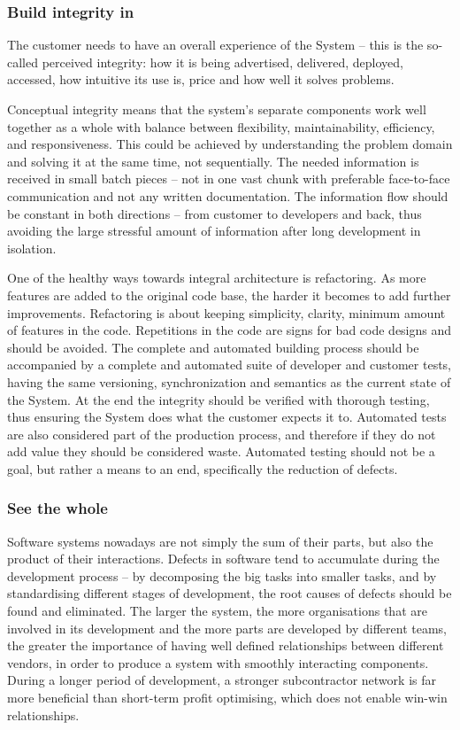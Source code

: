 \subsubsection{Build integrity in}

The customer needs to have an overall experience of the System -- this is the so-called perceived integrity: how it is being advertised, delivered, deployed, accessed, how intuitive its use is, price and how well it solves problems.

Conceptual integrity means that the system’s separate components work well together as a whole with balance between flexibility, maintainability, efficiency, and responsiveness. This could be achieved by understanding the problem domain and solving it at the same time, not sequentially. The needed information is received in small batch pieces -- not in one vast chunk with preferable face-to-face communication and not any written documentation. The information flow should be constant in both directions -- from customer to developers and back, thus avoiding the large stressful amount of information after long development in isolation.

One of the healthy ways towards integral architecture is refactoring. As more features are added to the original code base, the harder it becomes to add further improvements. Refactoring is about keeping simplicity, clarity, minimum amount of features in the code. Repetitions in the code are signs for bad code designs and should be avoided. The complete and automated building process should be accompanied by a complete and automated suite of developer and customer tests, having the same versioning, synchronization and semantics as the current state of the System. At the end the integrity should be verified with thorough testing, thus ensuring the System does what the customer expects it to. Automated tests are also considered part of the production process, and therefore if they do not add value they should be considered waste. Automated testing should not be a goal, but rather a means to an end, specifically the reduction of defects.

\subsubsection{See the whole}

Software systems nowadays are not simply the sum of their parts, but also the product of their interactions. Defects in software tend to accumulate during the development process -- by decomposing the big tasks into smaller tasks, and by standardising different stages of development, the root causes of defects should be found and eliminated. The larger the system, the more organisations that are involved in its development and the more parts are developed by different teams, the greater the importance of having well defined relationships between different vendors, in order to produce a system with smoothly interacting components. During a longer period of development, a stronger subcontractor network is far more beneficial than short-term profit optimising, which does not enable win-win relationships.

